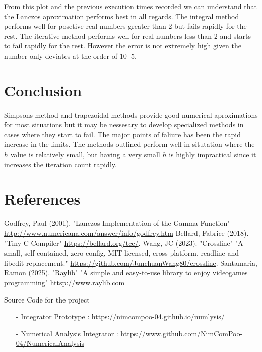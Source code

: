 \documentclass[12pt]{article}
\begin{document}
From this plot and the previous execution times recorded we can understand that the Lanczos aproximation performs best in all regards.
The integral method performs well for posetive real numbers greater than 2 but fails rapidly for the rest. The iterative method performs
well for real numbers less than 2 and starts to fail rapidly for the rest. However the error is not extremely high given the number only 
deviates at the order of $10^-5$.

\pagebreak
\section{Conclusion}

Simpsons method and trapezoidal methods provide good numerical aproximations for most situations but it may be nessesary to develop specialized
methods in cases where they start to fail. The major points of faliure has been the rapid increase in the limits. The methods outlined perform
well in situtation where the $h$ value is relatively small, but having a very small $h$ is highly impractical since it increases the iteration
count rapidly.

\section{References}
\begin{thebibliography}{2}
	 Godfrey, Paul (2001). "Lanczos Implementation of the Gamma Function" \url{http://www.numericana.com/answer/info/godfrey.htm}
	 Bellard, Fabrice (2018). "Tiny C Compiler" \url{https://bellard.org/tcc/}.
	 Wang, JC (2023). "Crossline" "A small, self-contained, zero-config, MIT licensed, cross-platform, readline and libedit replacement." \url{https://github.com/JunchuanWang80/crossline}.
	 Santamaria, Ramon (2025). "Raylib" "A simple and easy-to-use library to enjoy videogames programming" \url{httsp://www.raylib.com}
\end{thebibliography}

\begin{flushleft}
	\begin{bf}
		\large
		Source Code for the project
	\end{bf}
	\begin{itemize}
		\item[-] Integrator Prototype : \url{https://nimcompoo-04.github.io/numlysis/}
		\item[-] Numerical Analysis Integrator : \url{https://www.github.com/NimComPoo-04/NumericalAnalysis}
	\end{itemize}
\end{flushleft}
\end{document}
